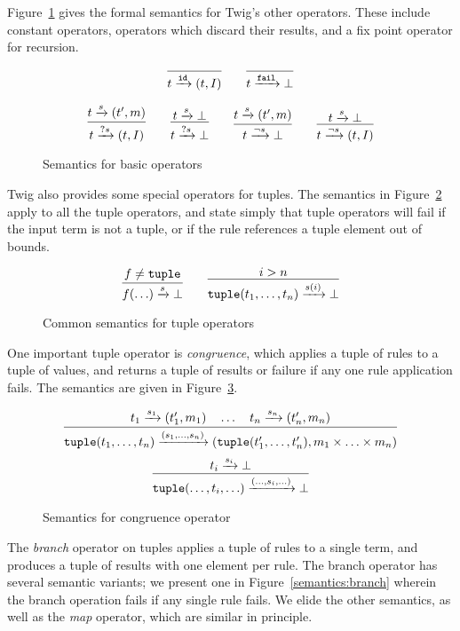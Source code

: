 Figure~\ref{semantics:basic} gives the formal semantics for Twig's other
operators. These include constant operators, operators which discard their
results, and a fix point operator for recursion.

\begin{figure}[ht]
\label{semantics:basic}
\[
\infer{t \arr{\mathtt{id}} (t,I)}{}
\qquad
\infer{t \arr{\mathtt{fail}} \bot}{}
\]

\[
\infer{t \arr{?s} (t,I)}{t \arr{s} (t',m)}
\qquad 
\infer{t \arr{?s} \bot}{t \arr{s} \bot}
\qquad
\infer{t \arr{\lnot s} \bot}{t \arr{s} (t',m)}
\qquad 
\infer{t \arr{\lnot s} (t,I)}{t \arr{s} \bot}
\]


\caption{Semantics for basic operators}
\end{figure}

Twig also provides some special operators for tuples. The semantics in
Figure~\ref{semantics:all-tuples} apply to all the tuple operators, and state
simply that tuple operators will fail if the input term is not a tuple, or if
the rule references a tuple element out of bounds.


\begin{figure}[ht]
\label{semantics:all-tuples}
\[
\infer{f(\ldots) \arr{s} \bot}
{f \neq \mathtt{tuple}}
\qquad
\infer{\mathtt{tuple}(t_1,\ldots,t_n) \arr{s(i)} \bot}{i > n}
\]
\caption{Common semantics for tuple operators}
\end{figure}


One important tuple operator is \emph{congruence}, which applies a tuple of
rules to a tuple of values, and returns a tuple of results or failure if any
one rule application fails. The semantics are given in
Figure~\ref{semantics:congruence}.


\begin{figure}[ht]
\label{semantics:congruence}
\[
\infer{
\mathtt{tuple}(t_1,\ldots,t_n)
\arr{(s_1,\ldots,s_n)}
(\mathtt{tuple}(t_1',\ldots,t_n'),m_1 \times \ldots \times m_n) }
{t_1 \arr{s_1} (t_1',m_1) \quad \ldots \quad t_n \arr{s_n} (t_n',m_n)}
\]
\[
\infer{
\mathtt{tuple}(\ldots,t_i,\ldots)
\arr{(\ldots,s_i,\ldots)}
\bot}
{t_i \arr{s_i} \bot}
\]
\caption{Semantics for congruence operator}
\end{figure}


The \emph{branch} operator on tuples applies a tuple of rules to a single
term, and produces a tuple of results with one element per rule. The branch
operator has several semantic variants; we present one in
Figure~\ref{semantics:branch} wherein the branch operation fails if any single
rule fails. We elide the other semantics, as well as the \emph{map} operator,
which are similar in principle.

